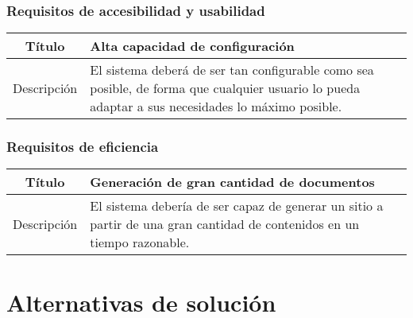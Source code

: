 \subsubsection{Requisitos de accesibilidad y usabilidad}

\begin{center}

    \begin{tabularx}{\textwidth}{|c|X|}
        \hline
        Título & Alta capacidad de configuración\\

        \hline

        Descripción & El sistema deberá de ser tan configurable como sea
        posible, de forma que cualquier usuario lo pueda adaptar a sus
        necesidades lo máximo posible.\\

        \hline
    \end{tabularx}
\end{center}

\subsubsection{Requisitos de eficiencia}

\begin{center}

    \begin{tabularx}{\textwidth}{|c|X|}
        \hline
        Título & Generación de gran cantidad de documentos\\

        \hline

        Descripción & El sistema debería de ser capaz de generar un sitio a
        partir de una gran cantidad de contenidos en un tiempo razonable.\\

        \hline
    \end{tabularx}
\end{center}


\section{Alternativas de solución}

